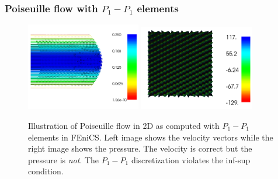 \begin{frame}
 \frametitle{Poiseuille flow with $P_1-P_1$ elements}
 \begin{center}
 \begin{figure}
 \includegraphics[width=5cm]{png/poiseuille_velocity.png}
 \includegraphics[width=5cm]{png/poiseuille_pressure_p1p1.png}
 \caption{Illustration of Poiseuille flow in 2D as computed with $P_1-P_1$ elements in FEniCS.
          Left image shows the velocity vectors while the right image shows the pressure.
          The velocity is correct but the pressure is \emph{not}. The $P_1-P_1$ discretization 
          violates the inf-sup condition.}
 \end{figure}
 \end{center}
\end{frame}

